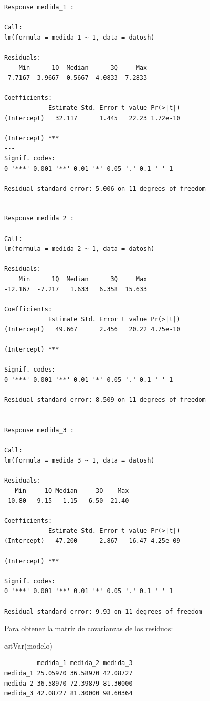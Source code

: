 \documentclass[
]{book}
\newenvironment{Shaded}{\begin{snugshade}}{\end{snugshade}}
\newcommand{\FunctionTok}[1]{\textcolor[rgb]{0.00,0.00,0.00}{#1}}
\newcommand{\NormalTok}[1]{#1}
\begin{document}
\begin{verbatim}
Response medida_1 :

Call:
lm(formula = medida_1 ~ 1, data = datosh)

Residuals:
    Min      1Q  Median      3Q     Max 
-7.7167 -3.9667 -0.5667  4.0833  7.2833 

Coefficients:
            Estimate Std. Error t value Pr(>|t|)
(Intercept)   32.117      1.445   22.23 1.72e-10
               
(Intercept) ***
---
Signif. codes:  
0 '***' 0.001 '**' 0.01 '*' 0.05 '.' 0.1 ' ' 1

Residual standard error: 5.006 on 11 degrees of freedom


Response medida_2 :

Call:
lm(formula = medida_2 ~ 1, data = datosh)

Residuals:
    Min      1Q  Median      3Q     Max 
-12.167  -7.217   1.633   6.358  15.633 

Coefficients:
            Estimate Std. Error t value Pr(>|t|)
(Intercept)   49.667      2.456   20.22 4.75e-10
               
(Intercept) ***
---
Signif. codes:  
0 '***' 0.001 '**' 0.01 '*' 0.05 '.' 0.1 ' ' 1

Residual standard error: 8.509 on 11 degrees of freedom


Response medida_3 :

Call:
lm(formula = medida_3 ~ 1, data = datosh)

Residuals:
   Min     1Q Median     3Q    Max 
-10.80  -9.15  -1.15   6.50  21.40 

Coefficients:
            Estimate Std. Error t value Pr(>|t|)
(Intercept)   47.200      2.867   16.47 4.25e-09
               
(Intercept) ***
---
Signif. codes:  
0 '***' 0.001 '**' 0.01 '*' 0.05 '.' 0.1 ' ' 1

Residual standard error: 9.93 on 11 degrees of freedom
\end{verbatim}

Para obtener la matriz de covarianzas de los residuos:

\begin{Shaded}
\begin{Highlighting}[]
\FunctionTok{estVar}\NormalTok{(modelo)}
\end{Highlighting}
\end{Shaded}

\begin{verbatim}
         medida_1 medida_2 medida_3
medida_1 25.05970 36.58970 42.08727
medida_2 36.58970 72.39879 81.30000
medida_3 42.08727 81.30000 98.60364
\end{verbatim}
\end{document}
